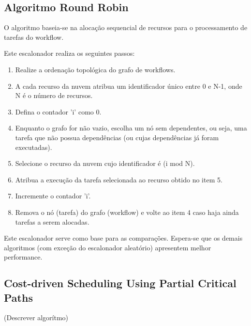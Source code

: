 \documentclass[a4paper,10pt]{article}
\begin{document}
\subsection{Algoritmo Round Robin}

O algoritmo baseia-se na alocação sequencial de recursos para o processamento de tarefas do workflow.

Este escalonador realiza os seguintes passos:

\begin{enumerate}

    \item Realize a ordenação topológica do grafo de workflows.

    \item A cada recurso da nuvem atribua um identificador único entre 0 e N-1, onde N é o número de recursos.

    \item Defina o contador 'i' como 0.

    \item Enquanto o grafo for não vazio, escolha um nó sem dependentes, ou seja, uma tarefa que não possua dependências 
(ou cujas dependências já foram executadas).

    \item Selecione o recurso da nuvem cujo identificador é (i mod N).

    \item Atribua a execução da tarefa selecionada ao recurso obtido no item 5.

    \item Incremente o contador 'i'.

    \item Remova o nó (tarefa) do grafo (workflow) e volte ao item 4 caso haja ainda tarefas a serem alocadas.

\end{enumerate}

Este escalonador serve como base para as comparações. Espera-se que os demais algoritmos (com exceção do escalonador
aleatório) apresentem melhor performance.

\subsection{Cost-driven Scheduling Using Partial Critical Paths}

(Descrever algorítmo)
\end{document}
